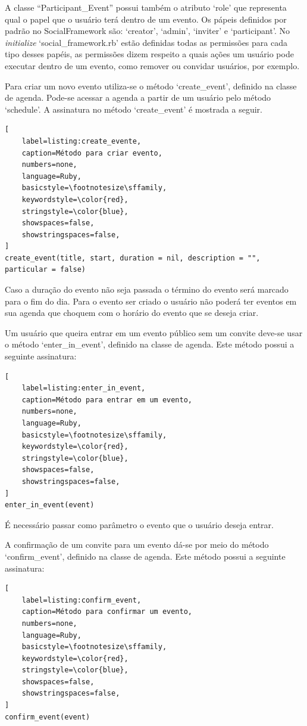 A classe ``Participant\_Event'' possui também o atributo `role' que representa qual o papel que o usuário terá dentro de um evento. Os pápeis definidos por padrão no SocialFramework são: `creator', `admin', `inviter' e `participant'. No \textit{initialize} `social\_framework.rb' estão definidas todas as permissões para cada tipo desses papéis, as permissões dizem respeito a quais ações um usuário pode executar dentro de um evento, como remover ou convidar usuários, por exemplo.

Para criar um novo evento utiliza-se o método `create\_event', definido na classe de agenda. Pode-se acessar a agenda a partir de um usuário pelo método `schedule'. A assinatura no método `create\_event' é mostrada a seguir.

\begin{lstlisting}[
    label=listing:create_evente,
    caption=Método para criar evento,
    numbers=none,
    language=Ruby,
    basicstyle=\footnotesize\sffamily,
    keywordstyle=\color{red},
    stringstyle=\color{blue},
    showspaces=false,
    showstringspaces=false,
]
create_event(title, start, duration = nil, description = "", particular = false)
\end{lstlisting}

Caso a duração do evento não seja passada o término do evento será marcado para o fim do dia.
Para o evento ser criado o usuário não poderá ter eventos em sua agenda que choquem com o horário do evento que se deseja criar.

Um usuário que queira entrar em um evento público sem um convite deve-se usar o método `enter\_in\_event', definido na classe de agenda. Este método possui a seguinte assinatura:

\begin{lstlisting}[
    label=listing:enter_in_event,
    caption=Método para entrar em um evento,
    numbers=none,
    language=Ruby,
    basicstyle=\footnotesize\sffamily,
    keywordstyle=\color{red},
    stringstyle=\color{blue},
    showspaces=false,
    showstringspaces=false,
]
enter_in_event(event)
\end{lstlisting}

É necessário passar como parâmetro o evento que o usuário deseja entrar.

A confirmação de um convite para um evento dá-se por meio do método `confirm\_event', definido na classe de agenda. Este método possui a seguinte assinatura:

\begin{lstlisting}[
    label=listing:confirm_event,
    caption=Método para confirmar um evento,
    numbers=none,
    language=Ruby,
    basicstyle=\footnotesize\sffamily,
    keywordstyle=\color{red},
    stringstyle=\color{blue},
    showspaces=false,
    showstringspaces=false,
]
confirm_event(event)
\end{lstlisting}

